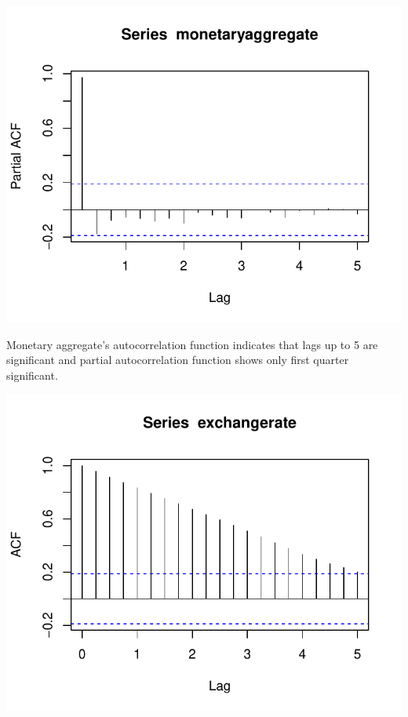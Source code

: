 \documentclass[11pt,preprint, authoryear]{elsarticle}
\numberwithin{equation}{section}
\numberwithin{figure}{section}
\numberwithin{table}{section}
\begin{document}
\begin{center}\includegraphics{README_files/figure-latex/unnamed-chunk-32-2} \end{center}

Monetary aggregate's autocorrelation function indicates that lags up to
5 are significant and partial autocorrelation function shows only first
quarter significant.

\begin{center}\includegraphics{README_files/figure-latex/unnamed-chunk-33-1} \end{center}
\end{document}
